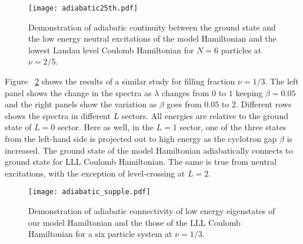 \documentclass[prb,aps,epsfig,longbibliography,twocolumn]{revtex4-1}
\begin{document}
\begin{figure}[h!]
	\texttt{[image: adiabatic25th.pdf]}
	\caption{ Demonstration of adiabatic continuity between the ground state and the low energy neutral excitations of the model Hamiltonian and the lowest Landau level Coulomb Hamiltonian for $N=6$ particles at $\nu=2/5$. 
	}
	\label{figA5}
\end{figure}

Figure ~\ref{figA6} shows the results of a similar study for filling fraction $\nu=1/3$. The left panel shows the change in the spectra as $\lambda$ changes from $0$ to $1$ keeping $\beta=0.05$ and the right panels show the variation as $\beta$ goes from $0.05$ to $2$. Different rows shows the spectra in different $L$ sectors. All energies are relative to the ground state of $L=0$ sector.
Here as well, in the $L=1$ sector, one of the three states from the left-hand side is projected out to high energy as the cyclotron gap $\beta$ is increased.
The ground state of the model Hamiltonian adiabatically connects to ground state for LLL Coulomb Hamiltonian. The same is true from neutral excitations, with the exception of level-crossing at $L=2$.

\begin{figure}[h!]
	\texttt{[image: adiabatic\_supple.pdf]}
	\caption{ Demonstration of adiabatic connectivity of low energy eigenstates of our model Hamiltonian and the those of the LLL Coulomb Hamiltonian for a six particle system at $\nu=1/3$. 
	}
	\label{figA6}
\end{figure}
\end{document}
